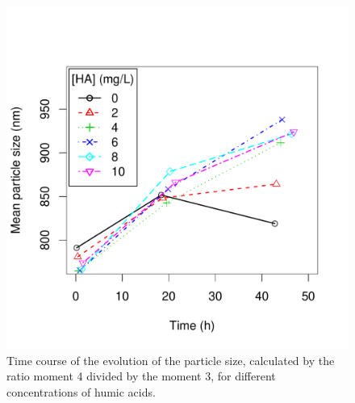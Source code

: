 \documentclass[journal=langd5,manuscript=article]{achemso}
\begin{document}
 \begin{figure}
  \includegraphics[width=\linewidth]{Figures/mean_particle_size.pdf}
  \caption{Time course of the evolution of the particle size, calculated by the  ratio moment 4 divided by the moment 3, for different concentrations of humic acids.} 
  \label{fgr:meansize}
\end{figure}


\end{document}
